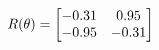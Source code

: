 \documentclass[preview]{standalone}
\begin{document}
\begin{align*}
\special{dvisvgm:raw <g id='unique000'>}R(\theta) = \begin{bmatrix}-0.31 & 0.95\\-0.95 & -0.31\end{bmatrix}\special{dvisvgm:raw </g>}
\end{align*}
\end{document}
